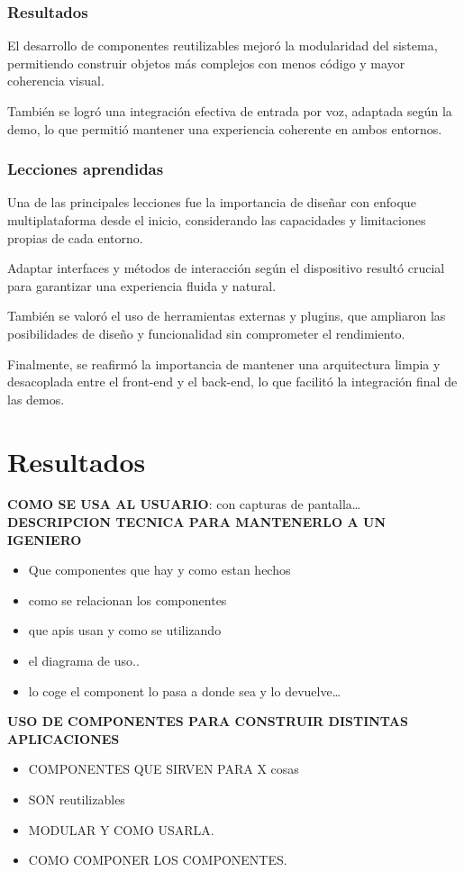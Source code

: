 \documentclass[a4paper, 12pt]{book}
\begin{document}
\subsection{Resultados}

El desarrollo de componentes reutilizables mejoró la modularidad del sistema, permitiendo construir objetos más complejos con menos código y mayor coherencia visual.

También se logró una integración efectiva de entrada por voz, adaptada según la demo, lo que permitió mantener una experiencia coherente en ambos entornos.
\subsection{Lecciones aprendidas}
Una de las principales lecciones fue la importancia de diseñar con enfoque multiplataforma desde el inicio, considerando las capacidades y limitaciones propias de cada entorno. 

Adaptar interfaces y métodos de interacción según el dispositivo resultó crucial para garantizar una experiencia fluida y natural.

También se valoró el uso de herramientas externas y plugins, que ampliaron las posibilidades de diseño y funcionalidad sin comprometer el rendimiento.

Finalmente, se reafirmó la importancia de mantener una arquitectura limpia y desacoplada entre el front-end y el back-end, lo que facilitó la integración final de las demos.
\chapter{Resultados}
\label{chap:resultados}
\textbf{COMO SE USA AL USUARIO}: con capturas de pantalla\dots
\textbf{DESCRIPCION TECNICA PARA MANTENERLO A UN IGENIERO}
\begin{itemize}
  \item Que componentes que hay y como estan hechos
  \item como se relacionan los componentes
  \item que apis usan y como se utilizando
  \item el diagrama de uso..
  \item lo coge el component lo pasa a donde sea y lo devuelve\dots
\end{itemize}
\textbf{USO DE COMPONENTES PARA CONSTRUIR DISTINTAS APLICACIONES}
\begin{itemize}
  \item COMPONENTES QUE SIRVEN PARA X cosas
  \item SON reutilizables
  \item MODULAR Y COMO USARLA.
  \item COMO COMPONER LOS COMPONENTES.
\end{itemize}
\end{document}
